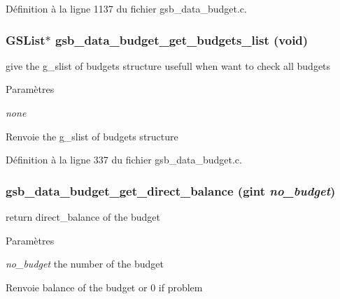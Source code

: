Définition à la ligne 1137 du fichier gsb\_\-data\_\-budget.c.

\subsubsection[{gsb\_\-data\_\-budget\_\-get\_\-budgets\_\-list}]{\setlength{\rightskip}{0pt plus 5cm}GSList$\ast$ gsb\_\-data\_\-budget\_\-get\_\-budgets\_\-list (void)}\label{gsb__data__budget_8h_a5c36c8f11ed3cd9c03a97c89a27fbc5b}
give the g\_\-slist of budgets structure usefull when want to check all budgets


\begin{DoxyParams}{Paramètres}
\item[{\em none}]\end{DoxyParams}
\begin{DoxyReturn}{Renvoie}
the g\_\-slist of budgets structure 
\end{DoxyReturn}


Définition à la ligne 337 du fichier gsb\_\-data\_\-budget.c.

\subsubsection[{gsb\_\-data\_\-budget\_\-get\_\-direct\_\-balance}]{ gsb\_\-data\_\-budget\_\-get\_\-direct\_\-balance (gint {\em no\_\-budget})}\label{gsb__data__budget_8h_a836a45313442b4fcd3e7bb52a031d8c7}
return direct\_\-balance of the budget


\begin{DoxyParams}{Paramètres}
\item[{\em no\_\-budget}]the number of the budget\end{DoxyParams}
\begin{DoxyReturn}{Renvoie}
balance of the budget or 0 if problem 
\end{DoxyReturn}


